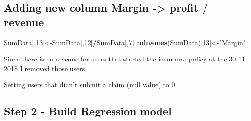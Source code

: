 \documentclass[]{article}
\newenvironment{Shaded}{\begin{snugshade}}{\end{snugshade}}
\newcommand{\KeywordTok}[1]{\textcolor[rgb]{0.13,0.29,0.53}{\textbf{#1}}}
\newcommand{\DecValTok}[1]{\textcolor[rgb]{0.00,0.00,0.81}{#1}}
\newcommand{\StringTok}[1]{\textcolor[rgb]{0.31,0.60,0.02}{#1}}
\newcommand{\OperatorTok}[1]{\textcolor[rgb]{0.81,0.36,0.00}{\textbf{#1}}}
\newcommand{\NormalTok}[1]{#1}
\begin{document}
\subsection{\texorpdfstring{Adding new column \textbf{Margin}
-\textgreater{} profit /
revenue}{Adding new column Margin -\textgreater{} profit / revenue}}\label{adding-new-column-margin---profit-revenue}

\begin{Shaded}
\begin{Highlighting}[]
\NormalTok{SumData[,}\DecValTok{13}\NormalTok{]<-SumData[,}\DecValTok{12}\NormalTok{]}\OperatorTok{/}\NormalTok{SumData[,}\DecValTok{7}\NormalTok{]}
\KeywordTok{colnames}\NormalTok{(SumData)[}\DecValTok{13}\NormalTok{]<-}\StringTok{"Margin"}
\end{Highlighting}
\end{Shaded}

Since there is no revenue for users that started the insurance policy at
the 30-11-2018 I removed those users

\begin{Shaded}
\end{Shaded}

Setting users that didn't submit a claim (null value) to 0

\begin{Shaded}
\end{Shaded}

\subsection{Step 2 - Build Regression
model}\label{step-2---build-regression-model}
\end{document}
